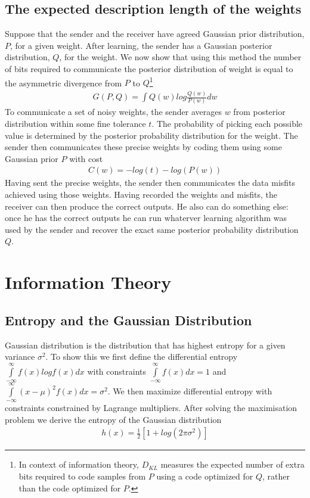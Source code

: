 \documentclass[class=article, crop=false]{standalone}
\numberwithin{equation}{section}
\begin{document}
\subsection{The expected description length of the weights}
Suppose that the sender and the receiver have agreed Gaussian prior distribution, $P$, for a given weight. After learning, the sender has a Gaussian posterior distribution, $Q$, for the weight. We now show that using this method the number of bits required to communicate the posterior distribution of weight is equal to the asymmetric divergence from $P$ to $Q$\footnote{In context of information theory, $D_{KL}$ measures the expected number of extra bits required to code samples from $P$ using a code optimized for $Q$, rather than the code optimized for $P$.}
\begin{align}
    G(P, Q)=\int Q(w)log\frac{Q(w)}{P(w)}dw
\end{align}\label{eqn:kl-div-pq}
To communicate a set of noisy weights, the sender averages $w$ from posterior distribution within some fine tolerance $t$. The probability of picking each possible value is determined by the posterior probability distribution for the weight. The sender then communicates these precise weights by coding them using some Gaussian prior $P$ with cost
\begin{align}
    C(w)=-log(t)-log(P(w))
\end{align}
Having sent the precise weights, the sender then communicates the data misfits achieved using those weights. Having recorded the weights and misfits, the receiver can then produce the correct outputs. He also can do something else: once he has the correct outputs he can run whaterver learning algorithm was used by the sender and recover the exact same posterior probability distribution $Q$.

\section{Information Theory}
\subsection{Entropy and the Gaussian Distribution}
Gaussian distribution is the distribution that has highest entropy for a given variance $\sigma^2$. To show this we first define the differential entropy $\int\limits_{-\infty}^\infty f(x)logf(x)dx$ with constraints $\int\limits_{-\infty}^\infty f(x)dx=1$ and $\int\limits_{-\infty}^\infty (x-\mu)^2f(x)dx=\sigma^2$. We then maximize differential entropy with constraints constrained by Lagrange multipliers. After solving the maximisation problem we derive the entropy of the Gaussian distribution
\begin{align}
    h(x)=\frac{1}{2}[1 + log(2\pi\sigma^2)]
\end{align}\label{eqn:gauss-entropy}
\end{document}
